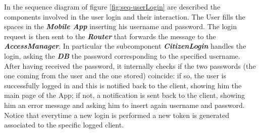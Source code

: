 \documentclass[a4paper]{report}
\begin{document}
In the sequence diagram of figure \ref{fig:seq-userLogin} are described the components involved in the user login and their interaction. The User fills the spaces in the \textbf{\textit{Mobile App}} inserting his username and password. The login request is then sent to the \textbf{\textit{Router}} that forwards the message to the \textbf{\textit{AccessManager}}. In particular the subcomponent \textbf{\textit{CitizenLogin}}  handles the login, asking the \textbf{\textit{DB}} the password corresponding to the specified username. After having received the password, it internally checks if  the two passwords (the one coming from the user and the one stored) coincide: if so, the user is successfully logged in and this is notified back to the client, showing him the main page of the App; if not, a notification is sent back to the client, showing him an error message and asking him to insert again username and password. Notice that everytime a new login is performed a new token is generated associated to the specific logged client.
\\\\
\end{document}
